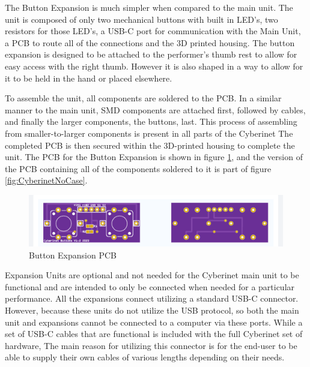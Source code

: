 The Button Expansion is much simpler when compared to the main unit. The unit is composed of only two mechanical buttons with built in LED's, two resistors for those LED's, a USB-C port for communication with the Main Unit, a PCB to route all of the connections and the 3D printed housing. The button expansion is designed to be attached to the performer's thumb rest to allow for easy access with the right thumb. However it is also shaped in a way to allow for it to be held in the hand or placed elsewhere.

To assemble the unit, all components are soldered to the PCB. In a similar manner to the main unit, SMD components are attached first, followed by cables, and finally the larger components, the buttons, last. This process of assembling from smaller-to-larger components is present in all parts of the Cyberinet  The completed PCB is then secured within the 3D-printed housing to complete the unit. The PCB for the Button Expansion is shown in figure \ref{fig:buttonPCB}, and the version of the PCB containing all of the components soldered to it is part of figure \ref{fig:CyberinetNoCase}.


\begin{center}
    \begin{figure}
        \centering
        \includegraphics[scale=0.5]{diagrams/PCBs/buttons1.2.png}
        \caption{Button Expansion PCB}
        \label{fig:buttonPCB}
    \end{figure}
\end{center}


Expansion Units are optional and not needed for the Cyberinet main unit to be functional and are intended to only be connected when needed for a particular performance. All the expansions connect utilizing a standard USB-C connector. However, because these units do not utilize the USB protocol, so both the main unit and expansions cannot be connected to a computer via these ports. While a set of USB-C cables that are functional is included with the full Cyberinet set of hardware, The main reason for utilizing this connector is for the end-user to be able to supply their own cables of various lengths depending on their needs. 


